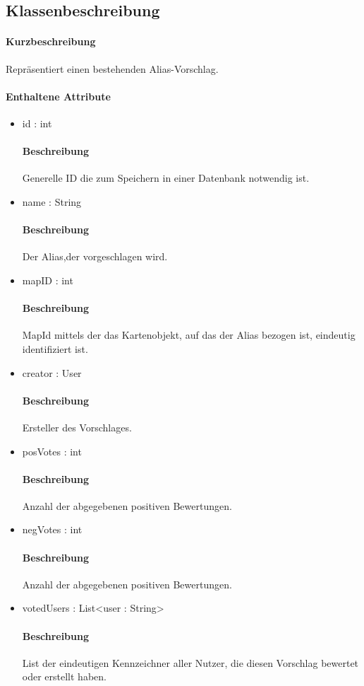 \subsection{Klassenbeschreibung}%
\paragraph*{Kurzbeschreibung}
    Repräsentiert einen bestehenden Alias-Vorschlag. 
\paragraph*{Enthaltene Attribute}
\begin{itemize}
    \item id : int
    		\paragraph*{Beschreibung}
            Generelle ID die zum Speichern in einer Datenbank notwendig ist.
    \item name : String
            \paragraph{Beschreibung}
            Der Alias,der vorgeschlagen wird.
    \item mapID : int
            \paragraph{Beschreibung}               
            MapId mittels der das Kartenobjekt, auf das der Alias bezogen ist, eindeutig identifiziert ist.     
    \item creator : User
            \paragraph{Beschreibung}               
            Ersteller des Vorschlages. 
    \item posVotes : int
            \paragraph{Beschreibung}               
            Anzahl der abgegebenen positiven Bewertungen.
    \item negVotes : int  
            \paragraph{Beschreibung}           
            Anzahl der abgegebenen positiven Bewertungen.   
    \item votedUsers : List<user : String>
            \paragraph{Beschreibung}        
            List der eindeutigen Kennzeichner aller Nutzer, die diesen Vorschlag bewertet oder erstellt haben.
\end{itemize}            